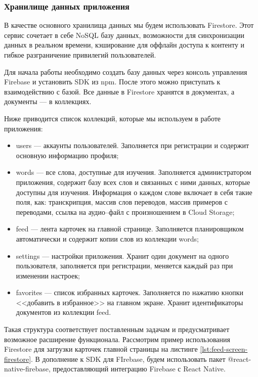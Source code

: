 \subsubsection{Хранилище данных приложения}
В качестве основного хранилища данных мы будем использовать Firestore. Этот сервис сочетает в себе NoSQL базу данных, возможности для синхронизации данных в реальном времени, кэширование для оффлайн доступа к контенту и гибкое разграничение привилегий пользователей.

Для начала работы необходимо создать базу данных через консоль управления Firebase и установить SDK из npm. После этого можно приступать к взаимодействию с базой. Все данные в Firestore хранятся в документах, а документы --- в коллекциях.

Ниже приводится список коллекций, которые мы используем в работе приложения:
\begin{itemize}
	\item users --- аккаунты пользователей. Заполняется при регистрации и содержит основную информацию профиля;
	\item words --- все слова, доступные для изучения. Заполняется администратором приложения, содержит базу всех слов и связанных с ними данных, которые доступны для изучения. Информация о каждом слове включает в себя такие поля, как: транскрипция, массив слов переводов, массив примеров с переводами, ссылка на аудио--файл с произношением в Cloud Storage;
	\item feed --- лента карточек на главной странице. Заполняется планировщиком автоматически и содержит копии слов из коллекции words;
	\item settings --- настройки приложения. Хранит один документ на одного пользователя, заполняется при регистрации, меняется каждый раз при изменении настроек;
	\item favorites --- список избранных карточек. Заполняется по нажатию кнопки <<добавить в избранное>> на главном экране. Хранит идентификаторы документов из коллекции feed.
\end{itemize}

Такая структура соответствует поставленным задачам и предусматривает возможное расширение функционала. Рассмотрим пример использования Firestore для загрузки карточек главной страницы на листинге \ref{lst:feed-screen-firestore}. В дополнение к SDK для FIrebase, будем использовать пакет @react-native-firebase, предоставляющий интеграцию Firebase с React Native.

